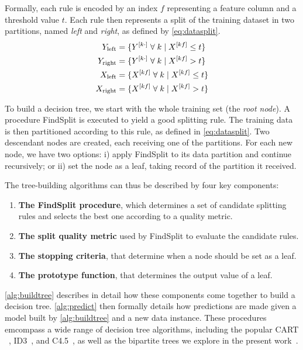 Formally, each rule is encoded by an index $f$ representing a feature column and a threshold value $t$. Each rule then represents a split of the training dataset in two partitions, named \emph{left} and \emph{right}, as defined by \autoref{eq:datasplit}.
%
\begin{equation}
    \begin{split} %
        Y_\text{left} &=\{Y\el{k\cdot} \;\forall\; k \mid X\el{kf} \le t\}\\
        Y_\text{right} &=\{Y\el{k\cdot} \;\forall\; k \mid X\el{kf} > t\}\\
        X_\text{left} &=\{X\el{kf} \;\forall\; k \mid X\el{kf} \le t\}\\
        X_\text{right} &=\{X\el{kf} \;\forall\; k \mid X\el{kf} > t\}\\
    \end{split}
    \label{eq:datasplit}
\end{equation}

To build a decision tree, we start with the whole training set (the \emph{root node}). A procedure FindSplit is executed to yield a good splitting rule.
The training data is then partitioned according to this rule, as defined in \autoref{eq:datasplit}. Two descendant nodes are created, each receiving one of the partitions.
For each new node, we have two options: i) apply FindSplit to its data partition and continue recursively; or ii) set the node as a leaf, taking record of the partition it received.

The tree-building algorithms can thus be described by four key components:
%
\begin{enumerate}
    \item \textbf{The FindSplit procedure}, which determines a set of candidate splitting rules and selects the best one according to a quality metric.
    \item \textbf{The split quality metric} used by FindSplit to evaluate the candidate rules.
    \item \textbf{The stopping criteria}, that determine when a node should be set as a leaf.
    \item \textbf{The prototype function}, that determines the output value of a leaf.
\end{enumerate}
%
\autoref{alg:buildtree} describes in detail how these components come together to build a decision tree. \autoref{alg:predict} then formally details how predictions are made given a model built by \autoref{alg:buildtree} and a new data instance.
%
These procedures emcompass a wide range of decision tree algorithms, including the popular CART ~\cite{breiman1984classification}, ID3~\cite{quinlan1986induction}, and C4.5~\cite{quinlan2014c4}, as well as the bipartite trees we explore in the present work~\cite{pliakos2018global}.  %

